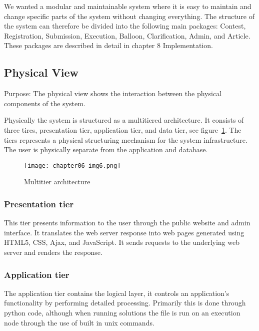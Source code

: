 We wanted a modular and maintainable system where it is easy to maintain
and change specific parts of the system without changing everything.
The structure of the system can therefore be divided into the following
main packages: Contest, Registration, Submission, Execution, Balloon,
Clarification, Admin, and Article. These packages are described in
detail in chapter 8 Implementation. 

\subsection{Physical View}

Purpose: \newline
The physical view shows the interaction between the physical components
of the system.

Physically the system is structured as a multitiered architecture. It
consists of three tires, presentation tier, application tier, and data
tier, see figure~\ref{fig:multitier}. The tiers represents a physical structuring
mechanism for the system infrastructure. The user is physically
separate from the application and database. 




\begin{figure}[h]
	\centering
	\texttt{[image: chapter06-img6.png]}
	\caption{Multitier architecture}
	\label{fig:multitier}
\end{figure}



\subsubsection{Presentation tier}

This tier presents information to the user through the public website
and admin interface. It translates the web server response into web
pages generated using HTML5, CSS, Ajax, and JavaScript. It sends
requests to the underlying web server and renders the response.




\subsubsection{Application tier}

The application tier contains the logical layer, it controls an
application's functionality by performing detailed
processing. Primarily this is done through python code, although when
running solutions the file is run on an execution node through the use
of built in unix commands. 

